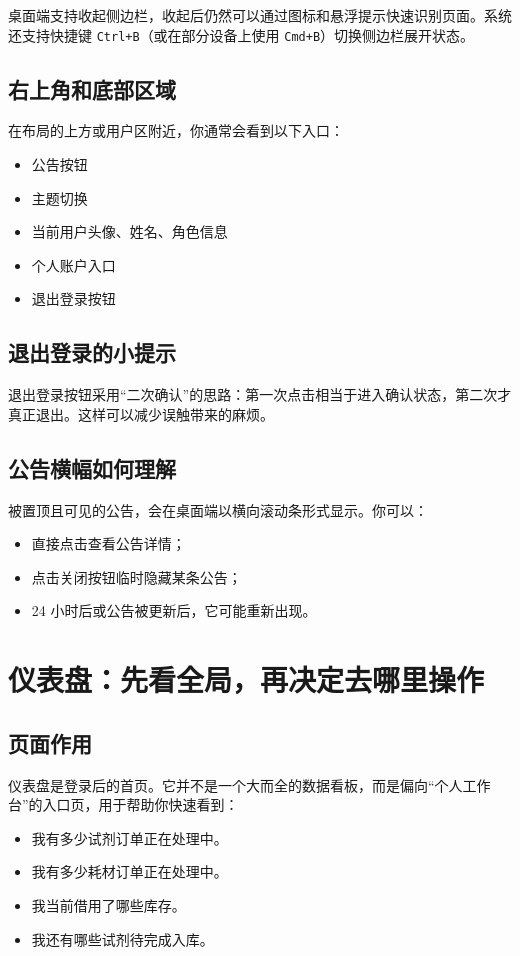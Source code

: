\documentclass[12pt,a4paper]{ctexart}
\begin{document}
桌面端支持收起侧边栏，收起后仍然可以通过图标和悬浮提示快速识别页面。系统还支持快捷键 \texttt{Ctrl+B}（或在部分设备上使用 \texttt{Cmd+B}）切换侧边栏展开状态。

\subsection{右上角和底部区域}
在布局的上方或用户区附近，你通常会看到以下入口：
\begin{itemize}
  \item 公告按钮
  \item 主题切换
  \item 当前用户头像、姓名、角色信息
  \item 个人账户入口
  \item 退出登录按钮
\end{itemize}

\subsection{退出登录的小提示}
退出登录按钮采用“二次确认”的思路：第一次点击相当于进入确认状态，第二次才真正退出。这样可以减少误触带来的麻烦。

\subsection{公告横幅如何理解}
被置顶且可见的公告，会在桌面端以横向滚动条形式显示。你可以：
\begin{itemize}
  \item 直接点击查看公告详情；
  \item 点击关闭按钮临时隐藏某条公告；
  \item 24 小时后或公告被更新后，它可能重新出现。
\end{itemize}

\newpage
\section{仪表盘：先看全局，再决定去哪里操作}

\subsection{页面作用}
仪表盘是登录后的首页。它并不是一个大而全的数据看板，而是偏向“个人工作台”的入口页，用于帮助你快速看到：
\begin{itemize}
  \item 我有多少试剂订单正在处理中。
  \item 我有多少耗材订单正在处理中。
  \item 我当前借用了哪些库存。
  \item 我还有哪些试剂待完成入库。
\end{itemize}
\end{document}
